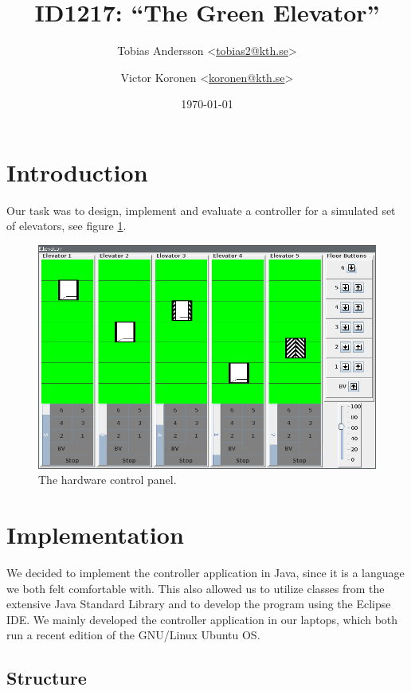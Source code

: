\documentclass[a4paper]{article}
\title{ID1217: ``The Green Elevator''}
\author{%
    Tobias Andersson <\href{mailto:tobias2@kth.se}{tobias2@kth.se}> \and
    Victor Koronen <\href{mailto:koronen@kth.se}{koronen@kth.se}>
}
\date{\today}
\begin{document}
\maketitle
\thispagestyle{empty}

\section{Introduction}

Our task was to design, implement and evaluate a controller for a simulated set
of elevators, see figure \ref{fig:hardware_control_panel}.

\begin{figure}[p]
    \centering
    \includegraphics[width=1.0\textwidth]{images/elevators_5_6.png}
    \caption{The hardware control panel.}
    \label{fig:hardware_control_panel}
\end{figure}

\section{Implementation}

We decided to implement the controller application in Java, since it is a
language we both felt comfortable with. This also allowed us to utilize classes
from the extensive Java Standard Library and to develop the program using the
Eclipse IDE. We mainly developed the controller application in our laptops,
which both run a recent edition of the GNU/Linux Ubuntu OS.

\subsection{Structure}
\end{document}
